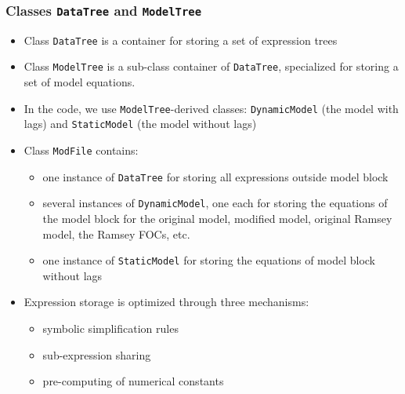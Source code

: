 \documentclass[aspectratio=169]{beamer}
\begin{document}
\begin{frame}
  \frametitle{Classes \texttt{DataTree} and \texttt{ModelTree}}
  \begin{itemize}
  \item Class \texttt{DataTree} is a container for storing a set of expression trees
  \item Class \texttt{ModelTree} is a sub-class container of \texttt{DataTree}, specialized for storing a set of model equations.
  \item In the code, we use \texttt{ModelTree}-derived classes: \texttt{DynamicModel} (the model with lags) and \texttt{StaticModel} (the model without lags)
  \item Class \texttt{ModFile} contains:
    \begin{itemize}
    \item one instance of \texttt{DataTree} for storing all expressions outside model block
    \item several instances of \texttt{DynamicModel}, one each for storing the equations of the model block for the original model, modified model, original Ramsey model, the Ramsey FOCs, etc.
    \item one instance of \texttt{StaticModel} for storing the equations of model block without lags
    \end{itemize}
  \item Expression storage is optimized through three mechanisms:
    \begin{itemize}
    \item symbolic simplification rules
    \item sub-expression sharing
    \item pre-computing of numerical constants
    \end{itemize}
  \end{itemize}
\end{frame}
\end{document}

